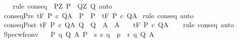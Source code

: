 \begin{isabellebody}
%
\isadelimproof
\ \ %
\endisadelimproof
%
\isatagproof
{}\isamarkupfalse%
\ {\isacharparenleft}rule\ conseq\ {\isacharbrackleft}\ {\isacharquery}P{\isacharprime}{\isacharequal}{\isachardoublequoteopen}{\isasymlambda}Z{\isachardot}\ P{\isacharprime}{\isachardoublequoteclose}\ \ {\isacharquery}Q{\isacharprime}{\isacharequal}{\isachardoublequoteopen}{\isasymlambda}Z{\isachardot}\ Q{\isacharprime}{\isachardoublequoteclose}{\isacharbrackright}{\isacharparenright}\ auto%
\endisatagproof
{\isafoldproof}%
%
\isadelimproof
\isanewline
%
\endisadelimproof
\isanewline
{}\isamarkupfalse%
\ conseqPre{\isacharcolon}\ {\isachardoublequoteopen}{\isasymGamma}{\isacharcomma}{\isasymTheta}{\isasymturnstile}\isactrlsub t\isactrlbsub {\isacharslash}F\isactrlesub \ P{\isacharprime}\ c\ Q{\isacharcomma}A\ {\isasymLongrightarrow}\ P\ {\isasymsubseteq}\ P{\isacharprime}\ {\isasymLongrightarrow}\ {\isasymGamma}{\isacharcomma}{\isasymTheta}{\isasymturnstile}\isactrlsub t\isactrlbsub {\isacharslash}F\isactrlesub \ P\ c\ Q{\isacharcomma}A{\isachardoublequoteclose}\isanewline
%
\isadelimproof
%
\endisadelimproof
%
\isatagproof
{}\isamarkupfalse%
\ {\isacharparenleft}rule\ conseq{\isacharparenright}\ auto%
\endisatagproof
{\isafoldproof}%
%
\isadelimproof
\isanewline
%
\endisadelimproof
\isanewline
{}\isamarkupfalse%
\ conseqPost{\isacharcolon}\ {\isachardoublequoteopen}{\isasymGamma}{\isacharcomma}{\isasymTheta}{\isasymturnstile}\isactrlsub t\isactrlbsub {\isacharslash}F\isactrlesub \ P\ c\ Q{\isacharprime}{\isacharcomma}A{\isacharprime}{\isasymLongrightarrow}\ Q{\isacharprime}\ {\isasymsubseteq}\ Q\ {\isasymLongrightarrow}\ A{\isacharprime}\ {\isasymsubseteq}\ A\ {\isasymLongrightarrow}\ \ \ {\isasymGamma}{\isacharcomma}{\isasymTheta}{\isasymturnstile}\isactrlsub t\isactrlbsub {\isacharslash}F\isactrlesub \ P\ c\ Q{\isacharcomma}A{\isachardoublequoteclose}\isanewline
%
\isadelimproof
\ \ %
\endisadelimproof
%
\isatagproof
{}\isamarkupfalse%
\ {\isacharparenleft}rule\ conseq{\isacharparenright}\ auto%
\endisatagproof
{\isafoldproof}%
%
\isadelimproof
\isanewline
%
\endisadelimproof
\isanewline
\isanewline
{}\isamarkupfalse%
\ Spec{\isacharunderscore}wf{\isacharunderscore}conv{\isacharcolon}\ \isanewline
\ \ {\isachardoublequoteopen}{\isacharparenleft}{\isasymlambda}{\isacharparenleft}P{\isacharcomma}\ q{\isacharcomma}\ Q{\isacharcomma}\ A{\isacharparenright}{\isachardot}\ {\isacharparenleft}P\ {\isasyminter}\ {\isacharbraceleft}s{\isachardot}\ {\isacharparenleft}{\isacharparenleft}s{\isacharcomma}\ q{\isacharparenright}{\isacharcomma}\ {\isasymtau}{\isacharcomma}\ p{\isacharparenright}\ {\isasymin}\ r{\isacharbraceright}{\isacharcomma}\ q{\isacharcomma}\ Q{\isacharcomma}\ A{\isacharparenright}{\isacharparenright}\ {\isacharbackquote}\isanewline

\end{isabellebody}
